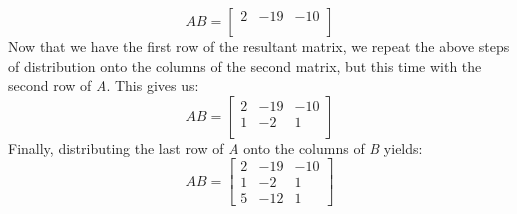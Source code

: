 \documentclass[12pt]{article}
\begin{document}
\[
AB = 
\begin{bmatrix}
    2  & -19 & -10 \\
     &  &  \\
     &  & 
\end{bmatrix}
\]
Now that we have the first row of the resultant matrix, we repeat the above steps of distribution onto the columns of the second matrix, but this time with the second row of \textit{A}. This gives us:
\[
AB = 
\begin{bmatrix}
    2  & -19 & -10 \\
    1 & -2 & 1 \\
     &  & 
\end{bmatrix}
\]
Finally, distributing the last row of \textit{A} onto the columns of \textit{B} yields:
\[
AB = 
\begin{bmatrix}
    2  & -19 & -10 \\
    1 & -2 & 1 \\
    5 & -12 & 1
\end{bmatrix}
\]
\end{document}
